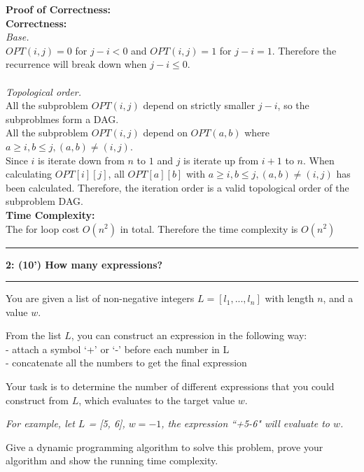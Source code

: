 \documentclass[10.5pt]{article}
\newcommand\question[2]{\vspace{.25in}\hrule\textbf{#1: #2}\vspace{.5em}\hrule\vspace{.10in}}
\newenvironment{main idea}{\textbf{Main Idea: }}{}
\newenvironment{prcor}{\textbf{Proof of Correctness: }\\}{}
\newenvironment{complexity}{\textbf{Time Complexity: }\\}{}
\theoremstyle{remark}
\begin{document}
\begin{prcor}
	\textbf{Correctness:}\\
	\textit{Base.}\\
	\(OPT(i, j) = 0\) for \(j - i < 0\) and \(OPT(i, j) = 1\) for \(j - i = 1\). Therefore the recurrence will break down when \(j - i \leq 0\).\\\\
	\textit{Topological order.}\\
	All the subproblem \(OPT(i, j)\) depend on strictly smaller \(j - i\), so the subproblmes form a DAG.\\
	All the subproblem \(OPT(i, j)\) depend on \(OPT(a, b)\) where \(a \ge i, b\le j, (a, b) \neq (i, j) \).\\
	Since \(i\) is iterate down from \(n\) to \(1\) and \(j\) is iterate up from \(i + 1\) to \(n\). When calculating \(OPT[i][j]\), all \(OPT[a][b]\) with \( a\ge i, b \le j, (a, b) \neq (i, j)\) has been calculated. Therefore, the iteration order is a valid topological order of the subproblem DAG.\\
\end{prcor}
\begin{complexity}
	The for loop cost \(O(n^2)\) in total. Therefore the time complexity is \(O(n^2)\)\\
\end{complexity}
\pagebreak
\question{2}{(10') How many expressions?}
You are given a list of non-negative integers $L=[l_1,...,l_n]$ with length $n$, and a value $w$.

From the list $L$, you can construct an expression in the following way:\\
\hspace*{0.5cm}- attach a symbol `+' or `-' before each number in L\\
\hspace*{0.5cm}- concatenate all the numbers to get the final expression

Your task is to determine the number of different expressions that you could construct from $L$, which evaluates to the target value $w$.

\textit{For example, let $L$ = [5, 6], $w=-1$, the expression ``+5-6" will evaluate to $w$.}

Give a dynamic programming algorithm to solve this problem, prove your algorithm and show the running
time complexity.
\end{document}
